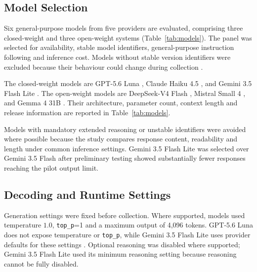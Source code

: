 \subsection{Model Selection}

Six general-purpose models from five providers are evaluated, comprising three
closed-weight and three open-weight systems
(Table~\ref{tab:models}). The panel was selected for availability, stable model
identifiers, general-purpose instruction following and inference cost. Models
without stable version identifiers were excluded because their behaviour could
change during collection
\cite{dhb-msftAnthropicModelsMicrosoft,
dhb-msftUnderstandingAIFunctionality,
dhb-msftOverviewAISubprocessors,
dhb-msftConnectMistralsAI}.

The closed-weight models are GPT-5.6 Luna
\cite{GPT56LunaModel,ModelGuidanceOpenAI}, Claude Haiku 4.5
\cite{IntroducingClaudeHaiku,ClaudeHaiku}, and Gemini 3.5 Flash Lite
\cite{IntroducingGemini362026,Gemini35FlashLitec}. The open-weight models are
DeepSeek-V4 Flash \cite{deepseekai2026deepseekv4,DeepSeekV4Preview},
Mistral Small 4
\cite{IntroducingMistralSmall,
MistralaiMistralSmall4119B2603Hugging2026,MistralSmall4},
and Gemma 4 31B \cite{Gemma4,gemmateam2026gemma4}. Their architecture,
parameter count, context length and release information are reported in
Table~\ref{tab:models}.

Models with mandatory extended reasoning or unstable identifiers were avoided
where possible because the study compares response content, readability and
length under common inference settings. Gemini 3.5 Flash Lite was selected over
Gemini 3.5 Flash after preliminary testing showed substantially fewer responses
reaching the pilot output limit.




\subsection{Decoding and Runtime Settings}
\label{subsec:decoding}

Generation settings were fixed before collection. Where supported, models used
temperature $1.0$, \texttt{top\_p}=1 and a maximum output of 4,096 tokens.
GPT-5.6 Luna does not expose temperature or \texttt{top\_p}, while Gemini 3.5
Flash Lite uses provider defaults for these settings
\cite{Gemini35FlashLitec}. Optional reasoning was disabled where supported;
Gemini 3.5 Flash Lite used its minimum reasoning setting because reasoning
cannot be fully disabled.

